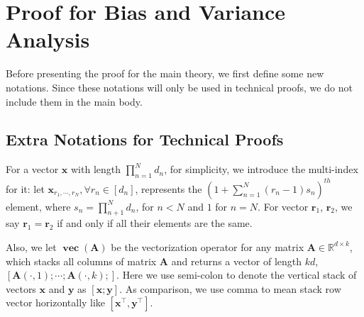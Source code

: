 \section{Proof for Bias and Variance Analysis}
\label{sec:appendix_proof}


Before presenting the proof for the main theory, we first define some new notations. Since these notations will only be used in technical proofs, we do not include them in the main body. 

\subsection*{Extra Notations for Technical Proofs} 
For a vector $\mathbf{x}$ with length $\prod_{n=1}^N d_n$, for simplicity, we introduce the multi-index for it: let $\mathbf{x}_{r_1, \cdots, r_N},\forall r_n \in [d_n]$, represents the $(1 + \sum_{n = 1}^N(r_n -1)s_n)^{th}$ element, where $s_n = \prod_{n+1}^Nd_n$, for $n < N$ and $1$ for $n = N$. For vector $\mathbf{r}_1$, $\mathbf{r}_2$, we say $\mathbf{r}_1 = \mathbf{r}_2$ if and only if 
all their elements are the same. 
\par 

Also, we let $\mathop{\mathbf{vec}}(\mathbf{A})$ be the vectorization operator for any matrix $\mathbf{A}\in \mathbb{R}^{d\times k}$, which stacks all columns of matrix $\mathbf{A}$ and returns a vector of length $kd$, 
$[\mathbf{A}(\cdot, 1); \cdots; \mathbf{A}(\cdot, k); ]$. Here we use semi-colon to denote the vertical stack of vectors $\mathbf{x}$ and $\mathbf{y}$ as $[\mathbf{x}; \mathbf{y}]$. As comparison, we use comma to mean stack row vector horizontally like $[\mathbf{x}^\top, \mathbf{y}^\top]$. 





